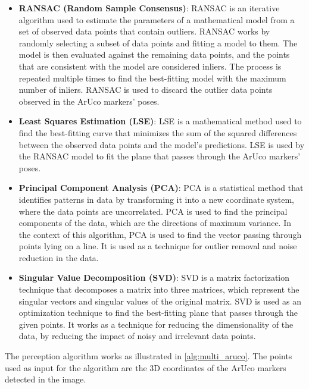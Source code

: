 \begin{itemize}
    \item \textbf{RANSAC (Random Sample Consensus)}: RANSAC is an iterative algorithm used to estimate
    the parameters of a mathematical model from a set of observed data points that contain outliers.
    RANSAC works by randomly selecting a subset of data points and fitting a model to them. The model is then
    evaluated against the remaining data points, and the points that are consistent with the model are considered
    inliers. The process is repeated multiple times to find the best-fitting model with the maximum number of inliers.
    RANSAC is used to discard the outlier data points observed in the ArUco markers' poses.
    \item \textbf{Least Squares Estimation (LSE)}: LSE is a mathematical method used to find the best-fitting curve
    that minimizes the sum of the squared differences between the observed data points and the model's predictions.
    LSE is used by the RANSAC model to fit the plane that passes through the ArUco markers' poses.
    \item \textbf{Principal Component Analysis (PCA)}: PCA is a statistical method that identifies patterns
    in data by transforming it into a new coordinate system, where the data points are uncorrelated.
    PCA is used to find the principal components of the data, which are the directions of maximum variance.
    In the context of this algorithm, PCA is used to find the vector passing through points lying on a line.
    It is used as a technique for outlier removal and noise reduction in the data.
    \item \textbf{Singular Value Decomposition (SVD)}: SVD is a matrix factorization technique that decomposes
    a matrix into three matrices, which represent the singular vectors and singular values of the original matrix.
    SVD is used as an optimization technique to find the best-fitting plane that passes through the given points.
    It works as a technique for reducing the dimensionality of the data, by reducing the impact of noisy
    and irrelevant data points.
\end{itemize}

The perception algorithm works as illustrated in \ref{alg:multi_aruco}. The points used as input for the algorithm
are the 3D coordinates of the ArUco markers detected in the image. 

